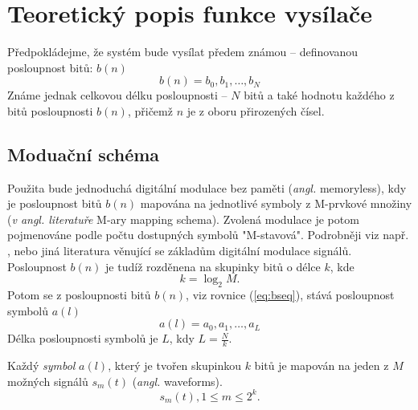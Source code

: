 



\section{Teoretický popis funkce vysílače} %

Předpokládejme, že systém bude vysílat předem známou -- definovanou posloupnost bitů: $b(n)$ 
\begin{equation}
 b(n) = {b_0,b_1,\ldots,b_N} \label{eq:bseq}
\end{equation}
Známe jednak celkovou délku posloupnosti -- $N$ bitů a také hodnotu každého z bitů posloupnosti $b(n)$, přičemž $n$ je z oboru přirozených čísel. 


\subsection{Moduační schéma}
\marginpar{\textcolor{txt_blue}{M-stavová modulace}}
Použita bude jednoduchá digitální modulace bez paměti (\textsl{angl.} memoryless), kdy je posloupnost bitů $b(n)$ mapována na jednotlivé symboly z M-prvkové množiny (\textsl{v angl. literatuře} M-ary mapping schema). Zvolená modulace je potom pojmenováne podle počtu dostupných symbolů "M-stavová". Podrobněji viz např. \cite{lathi2009}, \cite{proakis2007} nebo jiná literatura věnující se základům digitální modulace signálů. Posloupnost $b(n)$ je tudíž rozděnena na skupinky bitů o délce $k$, kde  
\begin{equation}
 k = \log_2M.  \label{eq:kfromM}
\end{equation}
Potom se z posloupnosti bitů $b(n)$, viz rovnice (\ref{eq:bseq}), stává posloupnost symbolů $a(l)$
\begin{equation}
 a(l) = {a_0,a_1,\ldots,a_L} \label{eq:sseq}
\end{equation}
Délka posloupnosti symbolů je $L$, kdy $L=\frac{N}{k}$.

\marginpar{\textcolor{txt_blue}{Bandpass signál}}
Každý \textsl{symbol} $a(l)$, který je tvořen skupinkou $k$ bitů je mapován na jeden z $M$ možných signálů $s_m(t)$ (\textsl{angl.} waveforms). 
\begin{equation}
 s_m(t), 1 \leq m \leq 2^k.  \label{eq:waveforms}
\end{equation}

